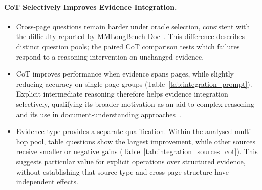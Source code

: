 \paragraph{CoT Selectively Improves Evidence Integration.}
\begin{itemize}
    \item Cross-page questions remain harder under oracle selection, consistent with the difficulty reported by MMLongBench-Doc~\citep{ma2024mmlongbench}. This difference describes distinct question pools; the paired CoT comparison tests which failures respond to a reasoning intervention on unchanged evidence.

    \item CoT improves performance when evidence spans pages, while slightly reducing accuracy on single-page groups (Table~\ref{tab:integration_prompt}). Explicit intermediate reasoning therefore helps evidence integration selectively, qualifying its broader motivation as an aid to complex reasoning~\citep{wei2022chain} and its use in document-understanding approaches~\citep{jia2025leopard,xiong2026docr1}.

    \item Evidence type provides a separate qualification. Within the analysed multi-hop pool, table questions show the largest improvement, while other sources receive smaller or negative gains (Table~\ref{tab:integration_sources_cot}). This suggests particular value for explicit operations over structured evidence, without establishing that source type and cross-page structure have independent effects.
\end{itemize}

